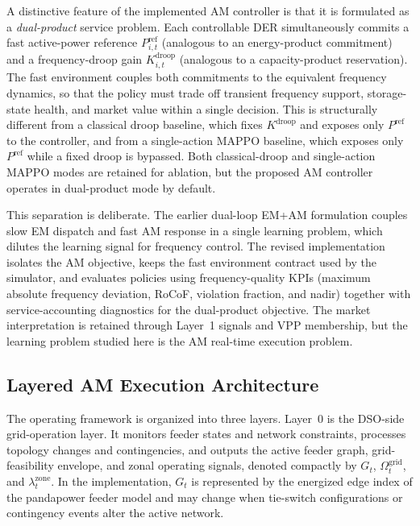 A distinctive feature of the implemented AM controller is that it is
formulated as a \emph{dual-product} service problem. Each controllable
DER simultaneously commits a fast active-power reference
$P^{\mathrm{ref}}_{i,t}$ (analogous to an energy-product commitment) and
a frequency-droop gain $K^{\mathrm{droop}}_{i,t}$ (analogous to a
capacity-product reservation). The fast environment couples both
commitments to the equivalent frequency dynamics, so that the policy
must trade off transient frequency support, storage-state health, and
market value within a single decision. This is structurally different
from a classical droop baseline, which fixes $K^{\mathrm{droop}}$ and
exposes only $P^{\mathrm{ref}}$ to the controller, and from a
single-action MAPPO baseline, which exposes only $P^{\mathrm{ref}}$
while a fixed droop is bypassed. Both classical-droop and single-action
MAPPO modes are retained for ablation, but the proposed AM controller
operates in dual-product mode by default.

This separation is deliberate. The earlier dual-loop EM+AM formulation
couples slow EM dispatch and fast AM response in a single learning
problem, which dilutes the learning signal for frequency control. The
revised implementation isolates the AM objective, keeps the fast
environment contract used by the simulator, and evaluates policies
using frequency-quality KPIs (maximum absolute frequency deviation,
RoCoF, violation fraction, and nadir) together with service-accounting
diagnostics for the dual-product objective. The market interpretation
is retained through Layer~1 signals and VPP membership, but the
learning problem studied here is the AM real-time execution problem.

\subsection{Layered AM Execution Architecture}
\label{ssec:layered_architecture}

The operating framework is organized into three layers. Layer~0 is the
DSO-side grid-operation layer. It monitors feeder states and network
constraints, processes topology changes and contingencies, and outputs
the active feeder graph, grid-feasibility envelope, and zonal operating
signals, denoted compactly by $G_t$, $\Omega_t^{\mathrm{grid}}$, and
$\lambda_t^{\mathrm{zone}}$. In the implementation, $G_t$ is represented
by the energized edge index of the pandapower feeder model and may
change when tie-switch configurations or contingency events alter the
active network.

